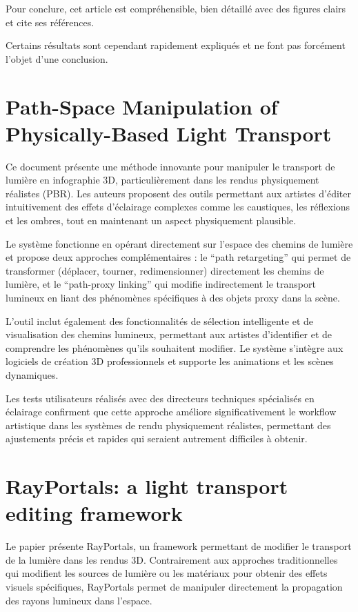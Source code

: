 \documentclass{article}
\begin{document}
Pour conclure, cet article est compréhensible, bien détaillé avec des figures clairs et cite ses références.

Certains résultats sont cependant rapidement expliqués et ne font pas forcément l’objet d’une conclusion.

\newpage
\section{Path-Space Manipulation of Physically-Based Light Transport}
Ce document présente une méthode innovante pour manipuler le transport de lumière en infographie 3D, particulièrement dans les rendus physiquement réalistes (PBR). Les auteurs proposent des outils permettant aux artistes d'éditer intuitivement des effets d'éclairage complexes comme les caustiques, les réflexions et les ombres, tout en maintenant un aspect physiquement plausible.

Le système fonctionne en opérant directement sur l'espace des chemins de lumière et propose deux approches complémentaires : le ``path retargeting'' qui permet de transformer (déplacer, tourner, redimensionner) directement les chemins de lumière, et le ``path-proxy linking'' qui modifie indirectement le transport lumineux en liant des phénomènes spécifiques à des objets proxy dans la scène. 

L'outil inclut également des fonctionnalités de sélection intelligente et de visualisation des chemins lumineux, permettant aux artistes d'identifier et de comprendre les phénomènes qu'ils souhaitent modifier. Le système s'intègre aux logiciels de création 3D professionnels et supporte les animations et les scènes dynamiques.

Les tests utilisateurs réalisés avec des directeurs techniques spécialisés en éclairage confirment que cette approche améliore significativement le workflow artistique dans les systèmes de rendu physiquement réalistes, permettant des ajustements précis et rapides qui seraient autrement difficiles à obtenir.

\section{RayPortals: a light transport editing framework}
Le papier présente RayPortals, un framework permettant de modifier le transport de la lumière dans les rendus 3D. Contrairement aux approches traditionnelles qui modifient les sources de lumière ou les matériaux pour obtenir des effets visuels spécifiques, RayPortals permet de manipuler directement la propagation des rayons lumineux dans l'espace.
\end{document}
